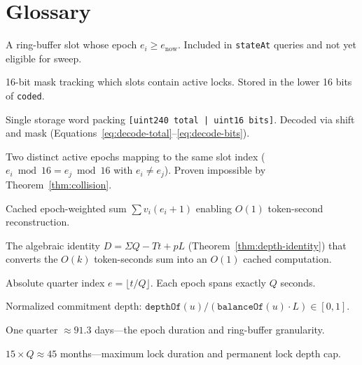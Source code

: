 \documentclass[10pt,a4paper,twocolumn]{article}
\theoremstyle{definition}
\theoremstyle{plain}
\theoremstyle{remark}
\begin{document}
\section*{Glossary}

\begin{description}[style=nextline, font=\normalfont\bfseries, leftmargin=1.5em]

\item[Active Slot] A ring-buffer slot whose epoch $e_i \geq e_{\text{now}}$. Included in \texttt{stateAt} queries and not yet eligible for sweep.

\item[Bitmap] 16-bit mask tracking which slots contain active locks. Stored in the lower 16 bits of \texttt{coded}.

\item[Coded] Single storage word packing \texttt{[uint240 total | uint16 bits]}. Decoded via shift and mask (Equations~\ref{eq:decode-total}--\ref{eq:decode-bits}).

\item[Collision] Two distinct active epochs mapping to the same slot index ($e_i \bmod 16 = e_j \bmod 16$ with $e_i \neq e_j$). Proven impossible by Theorem~\ref{thm:collision}.

\item[Depth ($\Sigma$)] Cached epoch-weighted sum $\sum v_i(e_i{+}1)$ enabling $O(1)$ token-second reconstruction.

\item[Depth Identity] The algebraic identity $D = \Sigma Q - Tt + pL$ (Theorem~\ref{thm:depth-identity}) that converts the $O(k)$ token-seconds sum into an $O(1)$ cached computation.

\item[Epoch] Absolute quarter index $e = \lfloor t/Q \rfloor$. Each epoch spans exactly $Q$ seconds.

\item[Lock Ratio ($\lambda$)] Normalized commitment depth: $\texttt{depthOf}(u) / (\texttt{balanceOf}(u) \cdot L) \in [0,1]$.

\item[LOCK\_TERM ($Q$)] One quarter $\approx 91.3$ days---the epoch duration and ring-buffer granularity.

\item[LOCK\_TIME ($L$)] $15 \times Q \approx 45$ months---maximum lock duration and permanent lock depth cap.


\end{description}
\end{document}
